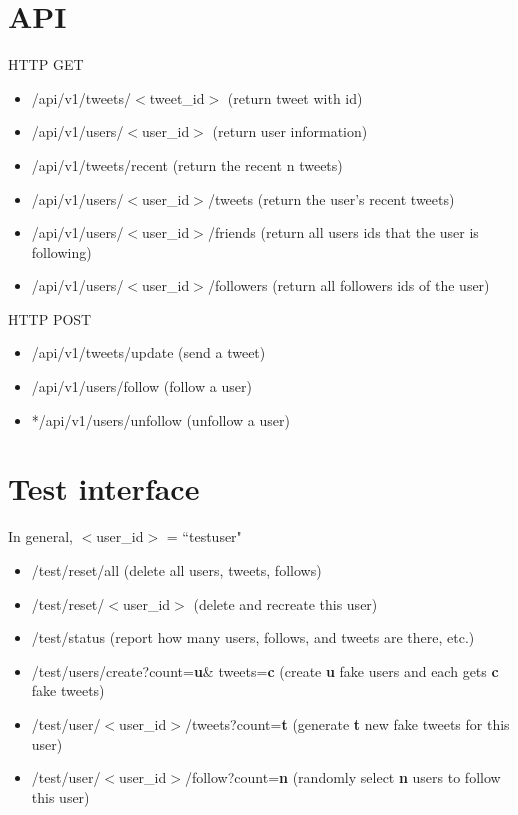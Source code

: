 \documentclass{article}
\begin{document}
	\section{API}
	HTTP GET
	\begin{itemize}
		\item /api/v1/tweets/$<$tweet\_id$>$ (return tweet with id)
		\item /api/v1/users/$<$user\_id$>$ (return user information)
		\item /api/v1/tweets/recent (return the recent n tweets)
		\item /api/v1/users/$<$user\_id$>$/tweets (return the user's recent tweets)
		\item /api/v1/users/$<$user\_id$>$/friends (return all users ids that the user is following)
		\item /api/v1/users/$<$user\_id$>$/followers (return all followers ids of the user)
	\end{itemize}
	HTTP POST
	\begin{itemize}
		\item /api/v1/tweets/update (send a tweet)
		\item /api/v1/users/follow (follow a user)
		\item */api/v1/users/unfollow (unfollow a user)
	\end{itemize}
	
	\section{Test interface}
	In general, $<$user\_id$>$ = ``testuser"
	\begin{itemize}
		\item /test/reset/all (delete all users, tweets, follows)
		\item /test/reset/$<$user\_id$>$ (delete and recreate this user)
		\item /test/status (report how many users, follows, and tweets are there, etc.)
		\item /test/users/create?count=\textbf{u}\& tweets=\textbf{c} (create \textbf{u} fake users and each gets \textbf{c} fake tweets)
		\item /test/user/$<$user\_id$>$/tweets?count=\textbf{t} (generate \textbf{t} new fake tweets for this user)
		\item /test/user/$<$user\_id$>$/follow?count=\textbf{n} (randomly select \textbf{n} users to follow this user)

	\end{itemize}
\end{document}

